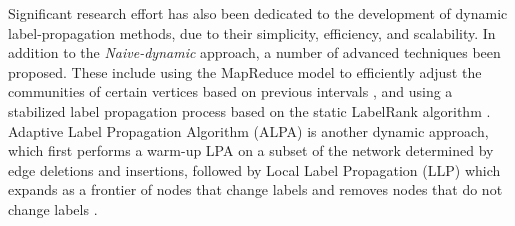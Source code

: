 Significant research effort has also been dedicated to the development of dynamic label-propagation methods, due to their simplicity, efficiency, and scalability. In addition to the \textit{Naive-dynamic} approach, a number of advanced techniques been proposed. These include using the MapReduce model to efficiently adjust the communities of certain vertices based on previous intervals \cite{com-li17}, and using a stabilized label propagation process based on the static LabelRank algorithm \cite{com-xie13}. Adaptive Label Propagation Algorithm (ALPA) is another dynamic approach, which first performs a warm-up LPA on a subset of the network determined by edge deletions and insertions, followed by Local Label Propagation (LLP) which expands as a frontier of nodes that change labels and removes nodes that do not change labels \cite{com-han17}.
